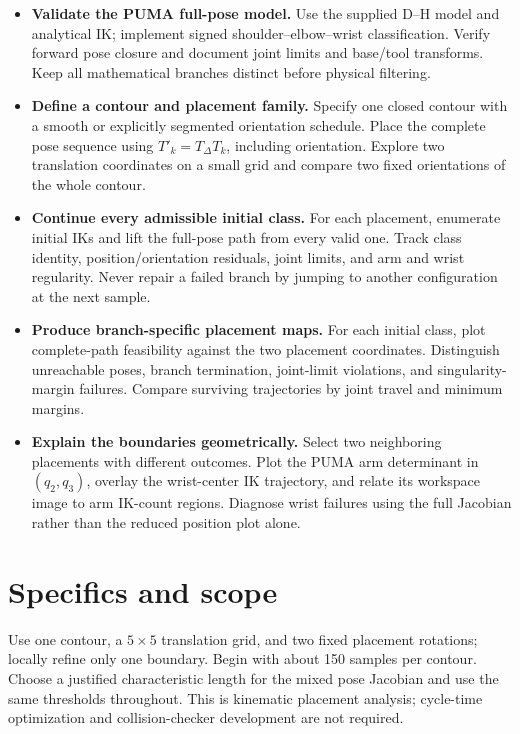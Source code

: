 \documentclass[11pt,a4paper]{article}
\begin{document}
\begin{itemize}
  \item \textbf{Validate the PUMA full-pose model.} Use the supplied D--H model
and analytical IK; implement signed shoulder--elbow--wrist classification. Verify
forward pose closure and document joint limits and base/tool transforms.
Keep all mathematical branches distinct before physical filtering.

  \item \textbf{Define a contour and placement family.} Specify one closed contour
with a smooth or explicitly segmented orientation schedule. Place the complete
pose sequence using $T'_k=T_\Delta T_k$, including orientation. Explore two
translation coordinates on a small grid and compare two fixed orientations
of the whole contour.

  \item \textbf{Continue every admissible initial class.} For each placement,
enumerate initial IKs and lift the full-pose path from every valid one.
Track class identity, position/orientation residuals, joint limits, and arm
and wrist regularity. Never repair a failed branch by jumping to another
configuration at the next sample.

  \item \textbf{Produce branch-specific placement maps.} For each initial class,
plot complete-path feasibility against the two placement coordinates.
Distinguish unreachable poses, branch termination, joint-limit violations,
and singularity-margin failures. Compare surviving trajectories by joint
travel and minimum margins.

  \item \textbf{Explain the boundaries geometrically.} Select two neighboring
placements with different outcomes. Plot the PUMA arm determinant in
$(q_2,q_3)$, overlay the wrist-center IK trajectory, and relate its workspace
image to arm IK-count regions. Diagnose wrist failures using the full
Jacobian rather than the reduced position plot alone.
\end{itemize}

\newpage
\section*{Specifics and scope}
Use one contour, a $5\times5$ translation grid, and two fixed placement
rotations; locally refine only one boundary. Begin with about 150 samples per
contour. Choose a justified characteristic length for the mixed pose Jacobian
and use the same thresholds throughout. This is kinematic placement analysis;
cycle-time optimization and collision-checker development are not required.
\end{document}
